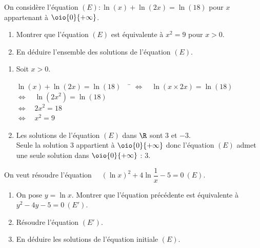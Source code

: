 \documentclass[a4paper,11pt,exos]{nsi} %
\begin{document}
\exo{}
On considère l'équation $(E) : \ln(x)+ \ln(2x)=\ln(18)$ pour $x$ appartenant à $\oio{0}{+\infty}$.
\begin{enumerate}
    \item Montrer que l'équation $(E)$ est équivalente à $x^2=9$ pour $x>0$.
    \item En déduire l'ensemble des solutions de l'équation $(E)$.
\end{enumerate}

\textcolor{UGLiBlue}{
    \begin{enumerate}
        \item Soit $x>0$.
        \begin{tabbing}
            $\ln(x)+ \ln(2x)=\ln(18)\quad$ \= $\iff \quad \ln(x\times 2x)=\ln(18)$\\
            \> $\iff \quad \ln(2x^2)=\ln(18)$\\
            \> $\iff \quad 2x^2=18$\\
            \> $\iff \quad x^2=9$
        \end{tabbing}
        \item Les solutions de l'équation $(E)$ dans $\R$ sont $3$ et $-3$.\\
        Seule la solution $3$ appartient à $\oio{0}{+\infty}$ donc l'équation $(E)$ admet une seule solution dans $\oio{0}{+\infty}$ : $3$.
    \end{enumerate}
}

\exo{ \faStar}
On veut résoudre l'équation $\quad \left(\ln x\right)^2+4\ln \dfrac{1}{x}-5=0\ (E)$.
\begin{enumerate}
    \item On pose $y=\ln x$. Montrer que l'équation précédente est équivalente à $y^2-4y-5=0\ (E')$.
    \item Résoudre l'équation $(E')$.
    \item En déduire les solutions de l'équation initiale $(E)$.
\end{enumerate}
\end{document}
